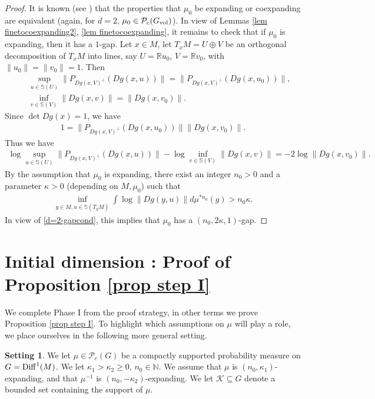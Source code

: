 \documentclass[11pt, leqno, fleqn]{amsart}
\def \R{{\mathbb R}}
\def \N{{\mathbb N}}
\newcommand{\cP}{{\mathcal P}}
\newcommand{\cK}{{\mathcal K}}
\newcommand{\aryst}{\begin{eqnarray*}}
\newcommand{\earyst}{\end{eqnarray*}}
\theoremstyle{definition}
\newtheorem{setting}[thm]{\bf Setting}
\theoremstyle{definition}
\def\S{ {\mathbb{S}} }
\def \vol{  {\rm vol} }
\newcommand{\Diff}{{\rm Diff}}
\begin{document}
		 \begin{proof}
		 It is known  (see \cite[Proposition 3.11]{DD}) that the properties that $\mu_{0}$ be expanding or coexpanding are equivalent (again, for $d=2$, $\mu_{0} \in \cP_c(G_{\vol})$). In view of  Lemmas \ref{lem finetocoexpanding2}, \ref{lem finetocoexpanding}, it remains to check that if $\mu_{0}$ is expanding, then it has a $1$-gap. 
		 	Let $x \in M$,  let $T_{x}M=U \oplus V$ be an orthogonal decomposition of $T_{x}M$ into lines, say $U=\R u_{0}$, $V=\R v_{0}$,  with $\|u_{0}\|=\|v_{0}\|=1$.
		 	Then
		 	\aryst
		 	&&   \sup_{u \in \S(U)} \| P_{Dg(x, V)^{\perp}}(  Dg(x, u) ) \|  =   \|  P_{Dg(x, V)^{\perp}}(  Dg(x,  u_{0} ) )  \|,  \\
		 	&&  \inf_{v \in \S(V)} \| Dg(x, v) \|  =  \| Dg(x, v_{0}) \|.
		 	\earyst
		 	Since $\det Dg(x) = 1$, we have 
		 	\aryst
		 	1 =    \|  P_{Dg(x, V)^{\perp}}(  Dg(x,  u_{0} ) )  \| \| Dg(x, v_{0}) \|.
		 	\earyst
		 	Thus we have   
		 	\begin{align} \label{d=2-gapcond}
 \log \sup_{u \in \S(U)} \| P_{Dg(x, V)^{\perp}}(  Dg(x, u) ) \|  - \log \inf_{v \in \S(V)} \| Dg(x, v) \|   = - 2 \log \| Dg(x, v_{0}) \|.
\end{align}
By the assumption that $\mu_{0}$ is expanding,  there exist an integer $n_0 > 0$ and a parameter $\kappa > 0$ (depending on $M, \mu_{0}$) such that  
\aryst 
\inf_{y \in M,  u \in \S(T_y M)}	 	\int  \log \| Dg(y, u) \|  d\mu^{* n_0}(g)  > n_0 \kappa.
\earyst
 In view of \eqref{d=2-gapcond}, this implies that $\mu_{0}$ has a $(n_{0}, 2\kappa, 1)$-gap.
		 \end{proof}
		 
		 	
\section{Initial dimension : Proof of Proposition \ref{prop step I}}	  \label{sec proof prop step I}


  We complete Phase I from the proof strategy, in other terms we prove Proposition \ref{prop step I}. To highlight which assumptions on $\mu$ will play a role, we place ourselves in  the following more general setting. 
  


  
 \begin{setting} \label{setting-posdim}
 We let $\mu\in \cP_{c}(G)$ be a compactly supported probability measure on $G=\Diff^1(M)$. We let $\kappa_{1}>\kappa_{2}\geq 0$, $n_{0}\in \N$. We assume that $\mu$ is $(n_{0},\kappa_{1})$-expanding, and that $\mu^{-1}$ is $(n_{0},-\kappa_{2})$-expanding. We let $\cK\subseteq G$ denote a bounded set containing the support of $\mu$.
 \end{setting} 
\end{document}
